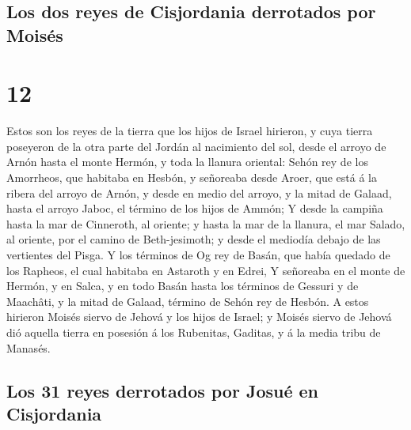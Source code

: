 \hypertarget{los-dos-reyes-de-cisjordania-derrotados-por-moisuxe9s}{%
\subsection{Los dos reyes de Cisjordania derrotados por
Moisés}\label{los-dos-reyes-de-cisjordania-derrotados-por-moisuxe9s}}

\hypertarget{section-11}{%
\section{12}\label{section-11}}

 Estos son los reyes de la tierra que los hijos de Israel
hirieron, y cuya tierra poseyeron de la otra parte del Jordán al
nacimiento del sol, desde el arroyo de Arnón hasta el monte Hermón, y
toda la llanura oriental:  Sehón rey de los Amorrheos, que
habitaba en Hesbón, y señoreaba desde Aroer, que está á la ribera del
arroyo de Arnón, y desde en medio del arroyo, y la mitad de Galaad,
hasta el arroyo Jaboc, el término de los hijos de Ammón; 
Y desde la campiña hasta la mar de Cinneroth, al oriente; y hasta la mar
de la llanura, el mar Salado, al oriente, por el camino de
Beth-jesimoth; y desde el mediodía debajo de las vertientes del Pisga.
 Y los términos de Og rey de Basán, que había quedado de
los Rapheos, el cual habitaba en Astaroth y en Edrei,  Y
señoreaba en el monte de Hermón, y en Salca, y en todo Basán hasta los
términos de Gessuri y de Maachâti, y la mitad de Galaad, término de
Sehón rey de Hesbón.  A estos hirieron Moisés siervo de
Jehová y los hijos de Israel; y Moisés siervo de Jehová dió aquella
tierra en posesión á los Rubenitas, Gaditas, y á la media tribu de
Manasés.

\hypertarget{los-31-reyes-derrotados-por-josuuxe9-en-cisjordania}{%
\subsection{Los 31 reyes derrotados por Josué en
Cisjordania}\label{los-31-reyes-derrotados-por-josuuxe9-en-cisjordania}}

